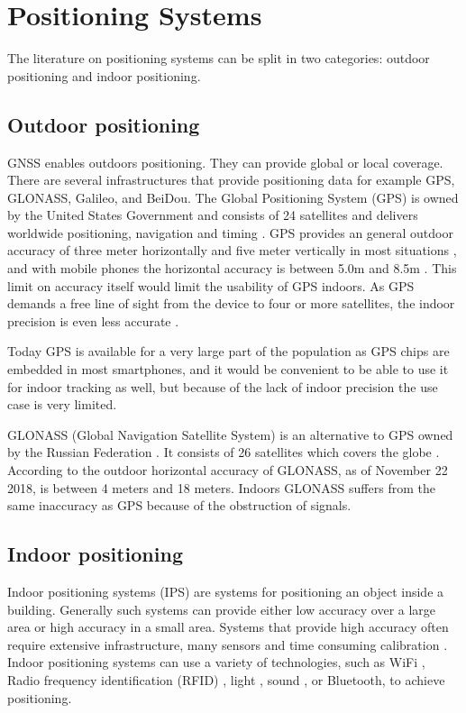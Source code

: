 \documentclass[../Main/thesis.tex]{subfiles}
\begin{document}
\section{Positioning Systems}
The literature on positioning systems can be split in two categories: outdoor positioning and indoor positioning.

\subsection{Outdoor positioning}
GNSS enables outdoors positioning.
They can provide global or local coverage.
There are several infrastructures that provide positioning data for example GPS, GLONASS, Galileo, and BeiDou.
The Global Positioning System (GPS) is owned by the United States Government and consists of 24 satellites and delivers worldwide positioning, navigation and timing \citep{U.S.DepartmentofDefence2008}.
GPS provides an general outdoor accuracy of three meter horizontally and five meter vertically in most situations \citep{U.S.DepartmentofDefence2008}, and with mobile phones the horizontal accuracy is between 5.0m and 8.5m \citep{Zandbergen2011a}.
This limit on accuracy itself would limit the usability of GPS indoors.
As GPS demands a free line of sight from the device to four or more satellites, the indoor precision is even less accurate \citep{Zandbergen2011a}.

Today GPS is available for a very large part of the population as GPS chips are embedded in most smartphones, and it would be convenient to be able to use it for indoor tracking as well, but because of the lack of indoor precision the use case is very limited.

GLONASS (Global Navigation Satellite System) is an alternative to GPS owned by the Russian Federation \citep{InformationandAnalysisCenterforPositioningNavigationandTiming2018}.
It consists of 26 satellites which covers the globe \citep{InformationandAnalysisCenterforPositioningNavigationandTiming2018a}.
According to \citet{Russiansystemofdifferentionalcorrectionandmonitoring2018} the outdoor horizontal accuracy of GLONASS, as of November 22 2018, is between 4 meters and 18 meters.
Indoors GLONASS suffers from the same inaccuracy as GPS because of the obstruction of signals.

\subsection{Indoor positioning}
\label{sec:indoor-positioning}
Indoor positioning systems (IPS) are systems for positioning an object inside a building.
Generally such systems can provide either low accuracy over a large area or high accuracy in a small area.
Systems that provide high accuracy often require extensive infrastructure, many sensors and time consuming calibration \citep{Curran2011}.
Indoor positioning systems can use a variety of technologies, such as WiFi \citep{chang2010robust}, Radio frequency identification (RFID) \citep{Saab2011}, light \citep{xiaohan2010improved}, sound \citep{schweinzer2010ultrasonic}, or Bluetooth, to achieve positioning.
\end{document}
